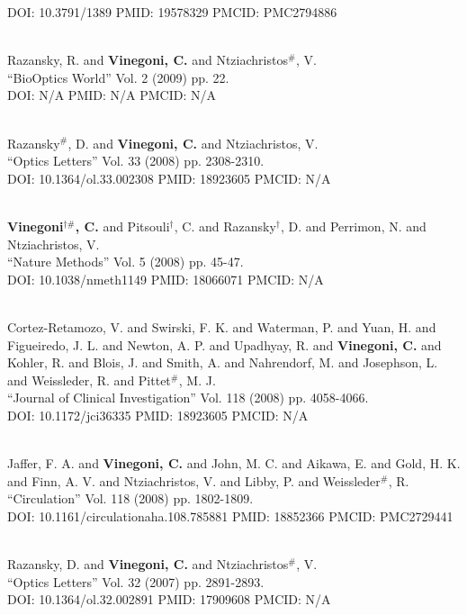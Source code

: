 DOI: 10.3791/1389 PMID: 19578329 PMCID: PMC2794886\item {} \\ Razansky, R. and {\bf Vinegoni, C.} and Ntziachristos$^\#$, V. \\ ``BioOptics World'' Vol. 2 (2009) pp. 22. \\ DOI: N/A PMID: N/A PMCID: N/A\item {} \\ Razansky$^\#$, D. and {\bf Vinegoni, C.} and Ntziachristos, V. \\ ``Optics Letters'' Vol. 33 (2008) pp. 2308-2310. \\ DOI: 10.1364/ol.33.002308 PMID: 18923605 PMCID: N/A\item {} \\ {\bf Vinegoni$^{\dag \#}$, C.} and Pitsouli$^\dag$, C. and Razansky$^\dag$, D. and Perrimon, N. and Ntziachristos, V. \\ ``Nature Methods'' Vol. 5 (2008) pp. 45-47. \\ DOI: 10.1038/nmeth1149 PMID: 18066071 PMCID: N/A\item {} \\ Cortez-Retamozo, V. and Swirski, F. K. and Waterman, P. and Yuan, H. and Figueiredo, J. L. and Newton, A. P. and Upadhyay, R. and {\bf Vinegoni, C.} and Kohler, R. and Blois, J. and Smith, A. and Nahrendorf, M. and Josephson, L. and Weissleder, R. and Pittet$^\#$, M. J. \\ ``Journal of Clinical Investigation'' Vol. 118 (2008) pp. 4058-4066. \\ DOI: 10.1172/jci36335 PMID: 18923605 PMCID: N/A\item {} \\ Jaffer, F. A. and {\bf Vinegoni, C.} and John, M. C. and Aikawa, E. and Gold, H. K. and Finn, A. V. and Ntziachristos, V. and Libby, P. and Weissleder$^\#$, R. \\ ``Circulation'' Vol. 118 (2008) pp. 1802-1809. \\ DOI: 10.1161/circulationaha.108.785881 PMID: 18852366 PMCID: PMC2729441\item {} \\ Razansky, D. and {\bf Vinegoni, C.} and Ntziachristos$^\#$, V. \\ ``Optics Letters'' Vol. 32 (2007) pp. 2891-2893. \\ DOI: 10.1364/ol.32.002891 PMID: 17909608 PMCID: N/A\item 